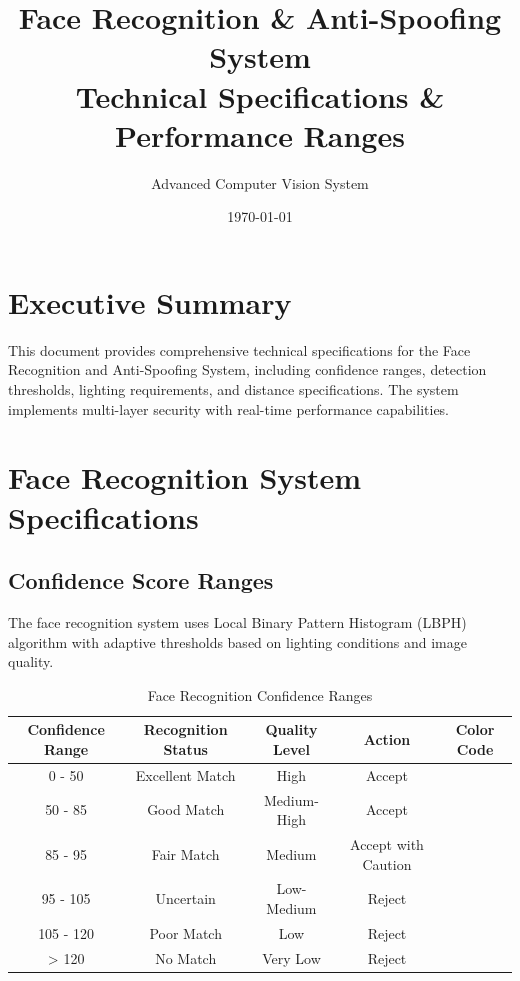 \documentclass[12pt,a4paper]{article}
\title{\textbf{Face Recognition \& Anti-Spoofing System}\\
       \large Technical Specifications \& Performance Ranges}
\author{Advanced Computer Vision System}
\date{\today}
\begin{document}
\maketitle

\tableofcontents
\newpage

\section{Executive Summary}

This document provides comprehensive technical specifications for the Face Recognition and Anti-Spoofing System, including confidence ranges, detection thresholds, lighting requirements, and distance specifications. The system implements multi-layer security with real-time performance capabilities.

\section{Face Recognition System Specifications}

\subsection{Confidence Score Ranges}

The face recognition system uses Local Binary Pattern Histogram (LBPH) algorithm with adaptive thresholds based on lighting conditions and image quality.

\begin{table}[h!]
\centering
\caption{Face Recognition Confidence Ranges}
\begin{tabular}{|c|c|c|c|c|}
\hline
\textbf{Confidence Range} & \textbf{Recognition Status} & \textbf{Quality Level} & \textbf{Action} & \textbf{Color Code} \\
\hline
0 - 50 & \textcolor{excellent}{Excellent Match} & High & Accept & \cellcolor{excellent!20} \\
\hline
50 - 85 & \textcolor{good}{Good Match} & Medium-High & Accept & \cellcolor{good!20} \\
\hline
85 - 95 & \textcolor{fair}{Fair Match} & Medium & Accept with Caution & \cellcolor{fair!20} \\
\hline
95 - 105 & \textcolor{poor}{Uncertain} & Low-Medium & Reject & \cellcolor{poor!20} \\
\hline
105 - 120 & \textcolor{critical}{Poor Match} & Low & Reject & \cellcolor{critical!20} \\
\hline
> 120 & \textcolor{critical}{No Match} & Very Low & Reject & \cellcolor{critical!20} \\
\hline
\end{tabular}
\end{table}
\end{document}
